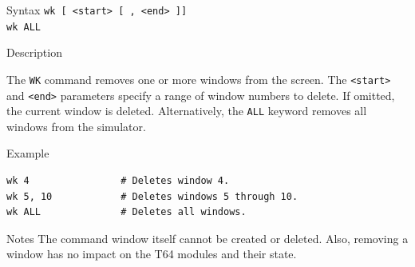 %
%
\pagebreak
{}

\begin{iPageDescEntry}{Syntax}
\texttt{wk [ <start> [ , <end> ]]} \\
\texttt{wk ALL} \\

\end{iPageDescEntry}

\begin{iPageDescEntry}{Description}

The \texttt{WK} command removes one or more windows from the screen. The \texttt{<start>} and \texttt{<end>} parameters specify a range of window numbers to delete. If omitted, the current window is deleted. Alternatively, the \texttt{ALL} keyword removes all windows from the simulator.

\end{iPageDescEntry}

\begin{iPageDescOpEntry}{Example}
\begin{lstlisting}[style=iPageOpStyle]
wk 4                # Deletes window 4.
wk 5, 10            # Deletes windows 5 through 10.
wk ALL              # Deletes all windows.
\end{lstlisting}
\end{iPageDescOpEntry}

\begin{iPageDescEntry}{Notes}
The command window itself cannot be created or deleted. Also, removing a window has no impact on the T64 modules and their state.
\end{iPageDescEntry}
